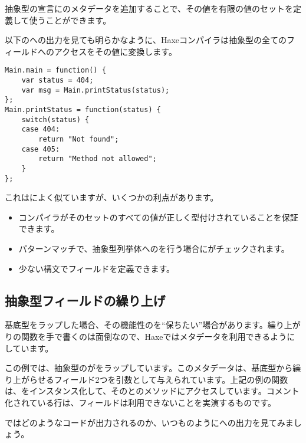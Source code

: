 抽象型の宣言にのメタデータを追加することで、その値を有限の値のセットを定義して使うことができます。


以下のへの出力を見ても明らかなように、Haxeコンパイラは抽象型の全てのフィールドへのアクセスをその値に変換します。

\begin{lstlisting}
Main.main = function() {
	var status = 404;
	var msg = Main.printStatus(status);
};
Main.printStatus = function(status) {
	switch(status) {
	case 404:
		return "Not found";
	case 405:
		return "Method not allowed";
	}
};
\end{lstlisting}

これはによく似ていますが、いくつかの利点があります。

\begin{itemize}
	\item コンパイラがそのセットのすべての値が正しく型付けされていることを保証できます。
	\item パターンマッチで、抽象型列挙体へのを行う場合にがチェックされます。
	\item 少ない構文でフィールドを定義できます。
\end{itemize}


\subsection{抽象型フィールドの繰り上げ}
\label{types-abstract-forward}

基底型をラップした場合、その機能性のを``保ちたい''場合があります。繰り上がりの関数を手で書くのは面倒なので、Haxeではメタデータを利用できるようにしています。


この例では、抽象型のがをラップしています。このメタデータは、基底型から繰り上がらせるフィールド2つを引数として与えられています。上記の例の関数は、をインスタンス化して、そのとのメソッドにアクセスしています。コメント化されている行は、フィールドは利用できないことを実演するものです。

ではどのようなコードが出力されるのか、いつものようにへの出力を見てみましょう。

